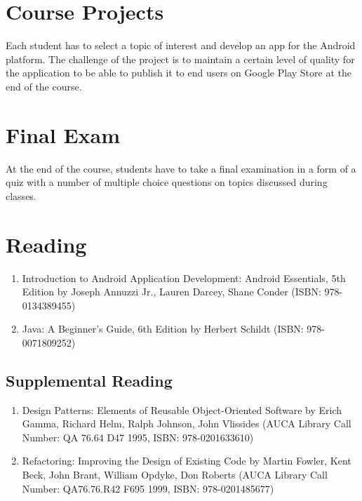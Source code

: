 \documentclass[12pt,a4paper,oneside]{article}
\begin{document}
    \section{Course Projects}

        Each student has to select a topic of interest and develop an app for
        the Android platform. The challenge of the project is to maintain a
        certain level of quality for the application to be able to publish it to
        end users on Google Play Store at the end of the course.

    \section{Final Exam}

        At the end of the course, students have to take a final examination in a
        form of a quiz with a number of multiple choice questions on topics
        discussed during classes.

    \section{Reading}

        \begin{enumerate}
            \item Introduction to Android Application Development: Android
            Essentials, 5th Edition by Joseph Annuzzi Jr., Lauren Darcey, Shane
            Conder (ISBN: 978-0134389455)
            \item Java: A Beginner's Guide, 6th Edition by Herbert Schildt (ISBN:
            978-0071809252)
        \end{enumerate}

            \subsection{Supplemental Reading}

                \begin{enumerate}
                    \item Design Patterns: Elements of Reusable Object-Oriented
                    Software by Erich Gamma, Richard Helm, Ralph Johnson, John
                    Vlissides (AUCA Library Call Number: QA 76.64 D47 1995,
                    ISBN: 978-0201633610)
                    \item Refactoring: Improving the Design of Existing Code by
                    Martin Fowler, Kent Beck, John Brant, William Opdyke, Don
                    Roberts (AUCA Library Call Number: QA76.76.R42 F695 1999,
                    ISBN: 978-0201485677)
                \end{enumerate}
\end{document}
